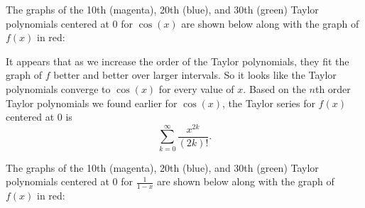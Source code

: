 \begin{activitySolution}
\item The graphs of the 10th (magenta), 20th (blue), and 30th (green) Taylor polynomials centered at 0 for $\cos(x)$ are shown below along with the graph of $f(x)$ in red:
\begin{center}  \end{center}
It appears that as we increase the order of the Taylor polynomials, they fit the graph of $f$ better and better over larger intervals. So it looks like the Taylor polynomials converge to $\cos(x)$ for every value of $x$.
Based on the $n$th order Taylor polynomials we found earlier for $\cos(x)$, the Taylor series for $f(x)$ centered at 0 is
\[\sum_{k=0}^{\infty} \frac{x^{2k}}{(2k)!}.\]

\item The graphs of the 10th (magenta), 20th (blue), and 30th (green) Taylor polynomials centered at 0 for $\frac{1}{1-x}$ are shown below along with the graph of $f(x)$ in red:
\begin{center}  \end{center}


\end{activitySolution}
